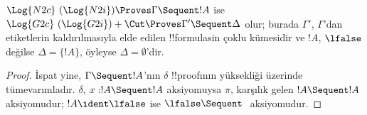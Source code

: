 



\begin{prop} $\Log{N2c}\ (\Log{N2i}) \Proves
\Gamma \Sequent !A$ ise $\Log{G2c}\ (\Log{G2i}) + \Cut \Proves \Gamma'
\Sequent \Delta$ olur; burada $\Gamma'$, $\Gamma$'dan etiketlerin
kaldırılmasıyla elde edilen !!{formula}s{}in çoklu kümesidir ve $!A$,
$\lfalse$ değilse $\Delta = \{!A\}$, öyleyse $\Delta = \emptyset$'dir.
\end{prop}

\begin{proof}
İspat yine, $\Gamma \Sequent !A$'nın $\delta$ !!{proof}{}ının yüksekliği üzerinde
tümevarımladır. $\delta$, $x:!A \Sequent !A$ aksiyomuysa $\pi$, karşılık gelen
$!A \Sequent !A$ aksiyomudur; $!A \ident \lfalse$ ise $\lfalse \Sequent \ $
aksiyomudur.


\end{proof}
